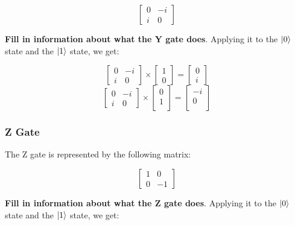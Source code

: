 \documentclass{article}
\begin{document}
\[
	\begin{bmatrix}
		0 & -i \\
		i & 0
	\end{bmatrix}
\]

\textbf{Fill in information about what the Y gate does}. Applying it to the $\ket{0}$ state and the $\ket{1}$ state, we get:

\[
	\begin{bmatrix}
		0 & -i \\
		i & 0
	\end{bmatrix}
	\times
	\begin{bmatrix}
		1 \\
		0
	\end{bmatrix}
	=
	\begin{bmatrix}
		0 \\
		i
	\end{bmatrix}
\]
\[
	\begin{bmatrix}
		0 & -i \\
		i & 0
	\end{bmatrix}
	\times
	\begin{bmatrix}
		0 \\
		1 \\
	\end{bmatrix}
	=
	\begin{bmatrix}
		-i \\
		0 \\
	\end{bmatrix}
\]

\subsubsection{Z Gate}
\label{sec:zgate}

The Z gate is represented by the following matrix:

\[
	\begin{bmatrix}
		1 & 0 \\
		0 & -1
	\end{bmatrix}
\]

\textbf{Fill in information about what the Z gate does}. Applying it to the $\ket{0}$ state and the $\ket{1}$ state, we get:
\end{document}
